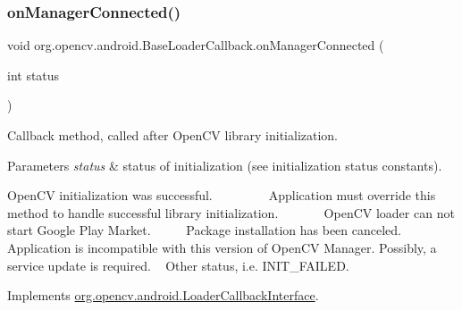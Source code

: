 \subsubsection{\texorpdfstring{on\+Manager\+Connected()}{onManagerConnected()}}
{\footnotesize\ttfamily void org.\+opencv.\+android.\+Base\+Loader\+Callback.\+on\+Manager\+Connected (\begin{DoxyParamCaption}\item[{int}]{status }\end{DoxyParamCaption})}

Callback method, called after Open\+CV library initialization. 
\begin{DoxyParams}{Parameters}
{\em status} & status of initialization (see initialization status constants). \\
\hline
\end{DoxyParams}
Open\+CV initialization was successful. ~\newline
~\newline
~\newline
~\newline
~\newline
 Application must override this method to handle successful library initialization. ~\newline
~\newline
~\newline
~\newline
 Open\+CV loader can not start Google Play Market. ~\newline
~\newline
~\newline
 Package installation has been canceled. ~\newline
~\newline
 Application is incompatible with this version of Open\+CV Manager. Possibly, a service update is required. ~\newline
 Other status, i.\+e. I\+N\+I\+T\+\_\+\+F\+A\+I\+L\+ED. 

Implements \mbox{\hyperlink{interfaceorg_1_1opencv_1_1android_1_1_loader_callback_interface_ad2407cf1886354b965b8ebd97b7164ff}{org.\+opencv.\+android.\+Loader\+Callback\+Interface}}.

\mbox{\label{classorg_1_1opencv_1_1android_1_1_base_loader_callback_a2d6f2c826a2b94af9a46cc5e28a43bf2}} 
